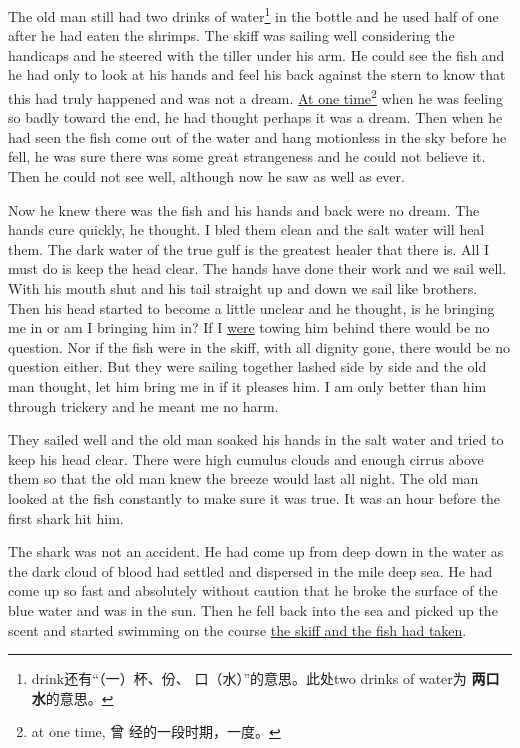 The old man still had two drinks of water\footnote{drink还有“（一）杯、份、
  口（水）”的意思。此处two drinks of water为 \textbf{两口水}的意思。} in
the bottle and he used half of one after he had eaten the shrimps. The skiff
was sailing well considering the \glspl{handicap} and he \gls{steered}
with the \gls{tiller} under his arm. He could see the fish and he had only
to look at his hands and feel his back against the stern to know that this
had truly happened and was not a dream. \uline{At one time}\footnote{at one time, 曾
  经的一段时期，一度。} when he was feeling so badly toward the end, he had
thought perhaps it was a dream. Then when he had seen the fish come out of
the water and hang \gls{motionless} in the sky before he fell, he was sure
there was some great \gls{strangeness} and he could not believe it. Then
he could not see well, although now he saw as well as ever.

Now he knew there was the fish and his hands and back were no dream. The
hands \gls{cure} quickly, he thought. I \gls{bled} them clean and the
salt water will \gls{heal} them. The dark water of the true gulf is the
greatest \gls{healer} that there is. All I must do is keep the head clear.
The hands have done their work and we sail well. With his mouth shut and his
tail straight up and down we sail like brothers. Then his head started to
become a little unclear and he thought, is he bringing me in or am I
bringing him in? If I \uline{were} \gls{towing} him behind there would be no
question. Nor if the fish were in the skiff, with all dignity gone, there
would be no question either. But they were sailing together lashed side by
side and the old man thought, let him bring me in if it pleases him. I am
only better than him through \gls{trickery} and he meant me no \gls{harm}.

They sailed well and the old man \gls{soaked} his hands in the salt water
and tried to keep his head clear. There were high cumulus clouds and enough
cirrus above them so that the old man knew the breeze would last all night.
The old man looked at the fish \gls{constantly} to make sure it was true.
It was an hour before the first shark hit him.

The shark was not an \gls{accident}. He had come up from deep down in the
water as the dark cloud of blood had settled and \gls{dispersed} in the mile
deep sea. He had come up so fast and absolutely without \gls{caution} that
he broke the surface of the blue water and was in the sun. Then he fell back
into the sea and picked up the scent and started swimming on the course \uline{the
skiff and the fish had taken}.

